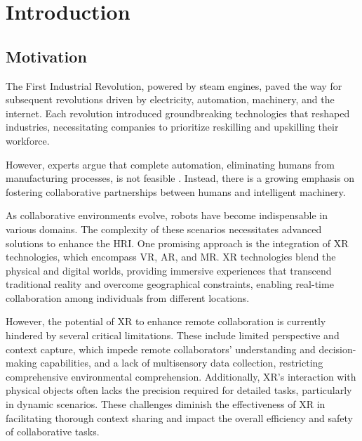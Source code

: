 \chapter{Introduction}%
\label{chapter:introduction}


\section{Motivation}
\label{section:Motivation}
% 
The First Industrial Revolution, powered by steam engines, paved the way for subsequent revolutions driven by electricity, automation, machinery, 
and the internet. Each revolution introduced groundbreaking technologies that reshaped industries, necessitating companies to prioritize reskilling 
and upskilling their workforce.

However, experts argue that complete automation, eliminating humans from manufacturing processes, is not feasible \cite{Weiss2021}. Instead, there is 
a growing emphasis on fostering collaborative partnerships between humans and intelligent machinery.

As collaborative environments evolve, robots have become indispensable in various domains.
The complexity of these scenarios necessitates advanced solutions to enhance the \ac{HRI}. One promising approach is the integration of \ac{XR} 
technologies, which encompass \ac{VR}, \ac{AR}, and \ac{MR}. \ac{XR} technologies blend the physical and digital worlds, providing immersive 
experiences that transcend traditional reality and overcome geographical constraints, enabling real-time collaboration among individuals from 
different locations.

However, the potential of \ac{XR} to enhance remote collaboration is currently hindered by several critical limitations. These include limited 
perspective and context capture, which impede remote collaborators' understanding and decision-making capabilities, and a lack of multisensory 
data collection, restricting comprehensive environmental comprehension. 
Additionally, \ac{XR}'s interaction with physical objects often lacks the precision required for detailed tasks, particularly in dynamic scenarios. 
These challenges diminish the effectiveness of \ac{XR} in facilitating thorough context sharing and impact the overall efficiency and safety of 
collaborative tasks.

